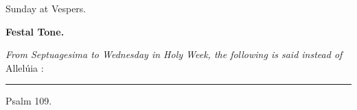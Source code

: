 \documentclass[letterpaper,12pt]{article} %
\begin{document}

\begin{center}{\huge Sunday at Vespers.}\end{center}


\def\greinitialformat#1{%
{\fontsize{40}{40}\selectfont #1}%
}


{\gresetfirstlineaboveinitial{\small\Vbar{}}{\small\Vbar{}}


{\bfseries Festal Tone.}

\large
{}}%
{\itshape From Septuagesima to Wednesday in Holy Week, the following is said instead of} Allelúia :

\smallskip
\hrule
\begin{center}{\Large Psalm 109.}\end{center}
\end{document}
